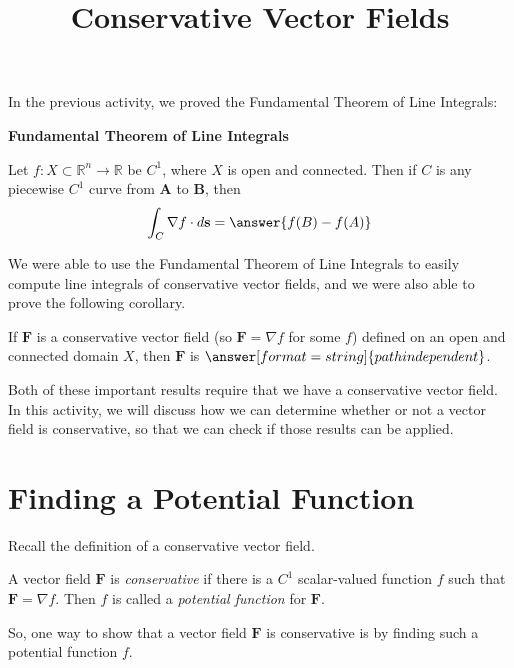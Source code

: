 \documentclass{ximera}
\title{Conservative Vector Fields}
\begin{document}
  
\begin{abstract}  
\end{abstract}  
\maketitle  

In the previous activity, we proved the Fundamental Theorem of Line Integrals:

\begin{theorem}
\textbf{Fundamental Theorem of Line Integrals}

Let $f:X\subset \mathbb{R}^n\rightarrow \mathbb{R}$ be $C^1$, where $X$ is open and connected. Then if $C$ is any piecewise $C^1$ curve from $\textbf{A}$ to $\textbf{B}$, then
\[
\int_C\nabla f\cdot d\textbf{s} = \answer{f(B)-f(A)}
\]
\end{theorem}

We were able to use the Fundamental Theorem of Line Integrals to easily compute line integrals of conservative vector fields, and we were also able to prove the following corollary.

\begin{corollary}
If $\textbf{F}$ is a conservative vector field (so $\textbf{F}=\nabla f$ for some $f$) defined on an open and connected domain $X$, then $\textbf{F}$ is $\answer[format=string]{path independent}$.
\end{corollary}

Both of these important results require that we have a conservative vector field. In this activity, we will discuss how we can determine whether or not a vector field is conservative, so that we can check if those results can be applied.

\section*{Finding a Potential Function}

Recall the definition of a conservative vector field.

\begin{definition}
A vector field $\mathbf{F}$ is \emph{conservative} if there is a $C^1$ scalar-valued function $f$ such that $\mathbf{F}=\nabla f$. Then $f$ is called a \emph{potential function} for $\mathbf{F}$.
\end{definition}

So, one way to show that a vector field $\mathbf{F}$ is conservative is by finding such a potential function $f$.
\end{document}
